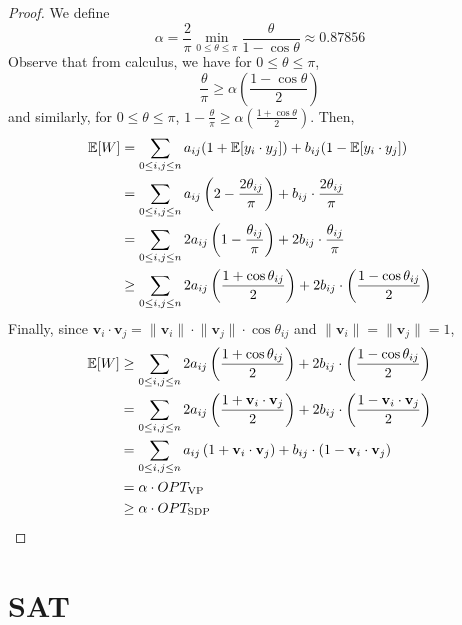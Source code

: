 \begin{proof}
    We define
    $$
    \alpha = \frac{2}{\pi} \min_{0 \leq \theta \leq \pi} \frac{\theta}{1 - \cos\theta} \approx 0.87856
    $$
    Observe that from calculus, we have for $0 \leq \theta \leq \pi$,
    $$
    \frac{\theta}{\pi} \geq \alpha \left( \frac{1 - \cos\theta}{2} \right) 
    $$
    and similarly, for $0 \leq \theta \leq \pi$, $1 - \frac{\theta}{\pi} \geq \alpha \left( \frac{1 + \cos\theta}{2} \right)$. Then,
    $$
    \begin{aligned}
        \mathbb{E}[W] &= \sum_{0\leq i,j \leq n} a_{ij} (1 + \mathbb{E}[y_i \cdot y_j]) + b_{ij} (1 - \mathbb{E}[y_i \cdot y_j]) \\
        &= \sum_{0 \leq i,j \leq n} a_{ij} \left( 2 - \frac{2\theta_{ij}}{\pi} \right) + b_{ij} \cdot \frac{2\theta_{ij}}{\pi} \\
        &= \sum_{0 \leq i,j \leq n} 2 a_{ij} \left( 1 - \frac{\theta_{ij}}{\pi} \right) + 2 b_{ij} \cdot \frac{\theta_{ij}}{\pi} \\
        &\geq \sum_{0 \leq i,j \leq n} 2 a_{ij} \left( \frac{1 + \cos\theta_{ij}}{2} \right) + 2 b_{ij} \cdot \left( \frac{1 - \cos\theta_{ij}}{2} \right)
    \end{aligned}
    $$
    Finally, since $\mathbf{v}_i \cdot \mathbf{v}_j = \lVert \mathbf{v}_i \rVert \cdot \lVert \mathbf{v}_j \rVert \cdot \cos\theta_{ij}$ and $\lVert \mathbf{v}_i \rVert = \lVert \mathbf{v}_j \rVert = 1$,
    $$
    \begin{aligned}
        \mathbb{E}[W] &\geq  \sum_{0 \leq i,j \leq n} 2 a_{ij} \left( \frac{1 + \cos\theta_{ij}}{2} \right) + 2 b_{ij} \cdot \left( \frac{1 - \cos\theta_{ij}}{2} \right) \\
        &= \sum_{0 \leq i,j \leq n} 2 a_{ij} \left( \frac{1 + \mathbf{v}_i \cdot \mathbf{v}_j}{2} \right) + 2 b_{ij} \cdot \left( \frac{1 - \mathbf{v}_i \cdot \mathbf{v}_j}{2} \right) \\
        &= \sum_{0 \leq i,j \leq n} a_{ij} \left( {1 + \mathbf{v}_i \cdot \mathbf{v}_j} \right) + b_{ij} \cdot \left( {1 - \mathbf{v}_i \cdot \mathbf{v}_j} \right) \\
        &=  \alpha \cdot OPT_{\mathrm{VP}} \\
        &\geq \alpha \cdot OPT_{\mathrm{SDP}} \\
    \end{aligned}
    $$
\end{proof}

\section{SAT}

